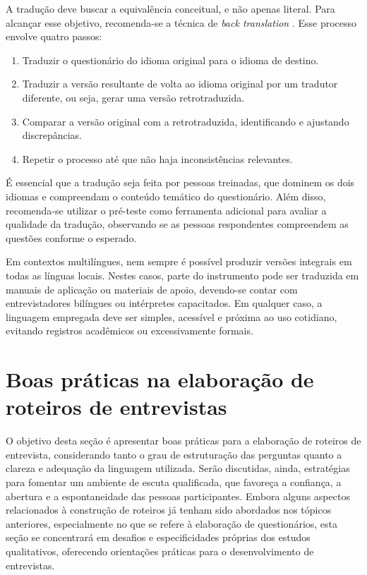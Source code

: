 \documentclass[12pt, a4paper, openany]{book}
\begin{document}
A tradu\c{c}\~ao deve buscar a equival\^encia conceitual, e n\~ao apenas literal. Para alcan\c{c}ar esse objetivo, recomenda-se a t\'ecnica de \textit{back translation} \citep{iarossi2006power}. Esse processo envolve quatro passos:

\begin{enumerate}
\item Traduzir o question\'ario do idioma original para o idioma de destino.
\item Traduzir a vers\~ao resultante de volta ao idioma original por um tradutor diferente, ou seja, gerar uma vers\~ao retrotraduzida.
\item Comparar a vers\~ao original com a retrotraduzida, identificando e ajustando discrep\^ancias.
\item Repetir o processo at\'e que n\~ao haja inconsist\^encias relevantes.
\end{enumerate}

\'E essencial que a tradu\c{c}\~ao seja feita por pessoas treinadas, que dominem os dois idiomas e compreendam o conte\'udo tem\'atico do question\'ario. Al\'em disso, recomenda-se utilizar o pr\'e-teste como ferramenta adicional para avaliar a qualidade da tradu\c{c}\~ao, observando se as pessoas respondentes compreendem as quest\~oes conforme o esperado.

Em contextos multil\'ingues, nem sempre \'e poss\'ivel produzir vers\~oes integrais em todas as l\'inguas locais. Nestes casos, parte do instrumento pode ser traduzida em manuais de aplica\c{c}\~ao ou materiais de apoio, devendo-se contar com entrevistadores bil\'ingues ou int\'erpretes capacitados. Em qualquer caso, a linguagem empregada deve ser simples, acess\'ivel e pr\'oxima ao uso cotidiano, evitando registros acad\^emicos ou excessivamente formais.

\section{Boas pr\'aticas na elabora\c{c}\~ao de roteiros de entrevistas}

O objetivo desta se\c{c}\~ao \'e apresentar boas pr\'aticas para a elabora\c{c}\~ao de roteiros de entrevista, considerando tanto o grau de estrutura\c{c}\~ao das perguntas quanto a clareza e adequa\c{c}\~ao da linguagem utilizada. Ser\~ao discutidas, ainda, estrat\'egias para fomentar um ambiente de escuta qualificada, que favore\c{c}a a confian\c{c}a, a abertura e a espontaneidade das pessoas participantes. Embora alguns aspectos relacionados \`a constru\c{c}\~ao de roteiros j\'a tenham sido abordados nos t\'opicos anteriores, especialmente no que se refere \`a elabora\c{c}\~ao de question\'arios, esta se\c{c}\~ao se concentrar\'a em desafios e especificidades pr\'oprias dos estudos qualitativos, oferecendo orienta\c{c}\~oes pr\'aticas para o desenvolvimento de entrevistas.
\end{document}
